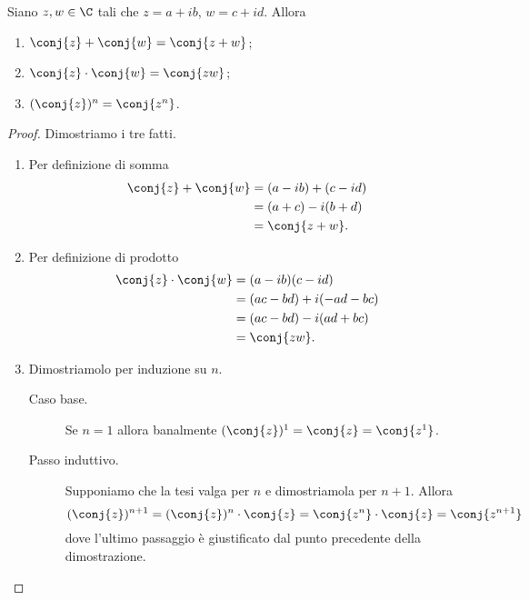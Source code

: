 \begin{proposition}\label{somma_prodotto_tra_coniugati}
    Siano $z, w \in \C$ tali che $z = a+ib$, $w = c + id$. Allora \begin{enumerate}[label={(\roman*)}]
        \item $\conj{z} + \conj{w} = \conj{z + w}$;
        \item $\conj{z}\cdot\conj{w} = \conj{zw}$;
        \item $(\conj{z})^n = \conj{z^n}$.
    \end{enumerate}
\end{proposition}
\begin{proof}
    Dimostriamo i tre fatti.
    \begin{enumerate}[label={(\roman*)}]
        \item Per definizione di somma \begin{alignat*}
            {1}
            \conj{z} + \conj{w} &= (a-ib) + (c - id)\\
            &= (a+c) - i(b+d)\\
            &= \conj{z + w}.
        \end{alignat*}
        \item Per definizione di prodotto \begin{alignat*}
            {1}
            \conj{z}\cdot\conj{w} &= (a-ib)(c - id)\\
            &= (ac - bd) + i(-ad-bc)\\
            &= (ac - bd) - i(ad+bc)\\
            &= \conj{zw}.
        \end{alignat*}
        \item Dimostriamolo per induzione su $n$.
        \begin{description}
            \item[Caso base.] Se $n = 1$ allora banalmente $(\conj{z})^1 = \conj{z} = \conj{z^1}$.
            \item[Passo induttivo.] Supponiamo che la tesi valga per $n$ e dimostriamola per $n+1$. Allora \[
                (\conj{z})^{n+1} = (\conj{z})^{n} \cdot \conj{z} = \conj{z^n} \cdot \conj{z} = \conj{z^{n+1}}
            \] dove l'ultimo passaggio è giustificato dal punto precedente della dimostrazione. \qedhere
        \end{description}
    \end{enumerate}
\end{proof}

